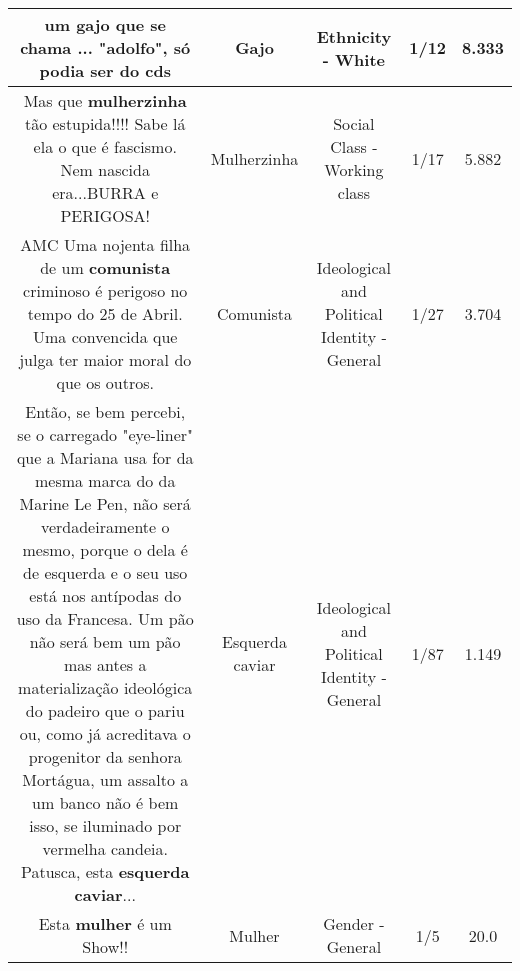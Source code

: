 \documentclass[11pt]{article}
\newlength\mylength
\begin{document}
\begin{center}
\begin{longtable}{|C{.65\mylength}|C{.30\mylength}|C{.12\mylength}|C{.12\mylength}|C{.12\mylength}|}
  \small um \textbf{gajo} que se chama ... "adolfo", só podia ser do cds\normalsize   & Gajo & Ethnicity - White & 1/12 & 8.333 \\  \hline
  \small Mas que \textbf{mulherzinha} tão estupida!!!! Sabe lá ela o que é fascismo. Nem nascida era...BURRA e PERIGOSA!\normalsize   & Mulherzinha & Social Class - Working class & 1/17 & 5.882 \\  \hline
  \small AMC Uma nojenta filha de um \textbf{comunista} criminoso é perigoso no tempo do 25 de Abril. Uma convencida que julga ter maior moral do que os outros.\normalsize   & Comunista & Ideological and Political Identity - General & 1/27 & 3.704 \\  \hline
  \small Então, se bem percebi, se o carregado "eye-liner" que a Mariana usa for da mesma marca do da Marine Le Pen, não será verdadeiramente o mesmo, porque o dela é de esquerda e o seu uso está nos antípodas do uso da Francesa. Um pão não será bem um pão mas antes a materialização ideológica do padeiro que o pariu ou, como já acreditava o progenitor da senhora Mortágua, um assalto a um banco não é bem isso, se iluminado por vermelha candeia. Patusca, esta \textbf{esquerda caviar}...\normalsize   & Esquerda caviar & Ideological and Political Identity - General & 1/87 & 1.149 \\  \hline
  \small Esta \textbf{mulher} é um Show!!\normalsize   & Mulher & Gender - General & 1/5 & 20.0 \\  \hline

\end{longtable}
\end{center}
\end{document}
